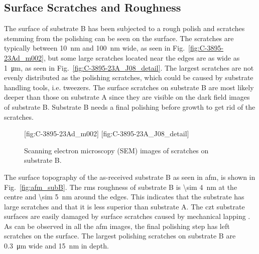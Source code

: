 \subsection{Surface Scratches and Roughness}
The surface of substrate B has been subjected to a rough polish and scratches stemming from the polishing can be seen on the surface. The scratches are typically between \SI{10}{\nano\metre} and \SI{100}{\nano\metre} wide, as seen in Fig.~\ref{fig:C-3895-23Ad_m002}, but some large scratches located near the edges are as wide as \SI{1}{\micro\metre}, as seen in Fig.~\ref{fig:C-3895-23A_J08_detail}. The largest scratches are not evenly distributed as the polishing scratches, which could be caused by substrate handling tools, i.e. tweezers. The surface scratches on substrate B are most likely deeper than those on substrate A since they are visible on the dark field images of substrate B. Substrate B needs a final polishing before growth to get rid of the scratches.
\begin{figure}[htbp]
    \centering
    [fig:C-3895-23Ad_m002]
    [fig:C-3895-23A_J08_detail]
    \caption[SEM images of scratches on substrate B.]{Scanning electron microscopy (SEM) images of scratches on substrate B.}
    \label{fig:SEM_C389523_scratches}
\end{figure}

The surface topography of the as-received substrate B as seen in \ac{afm}, is shown in Fig.~\ref{fig:afm_subB}. The \ac{rms} roughness of substrate B is \SI{\sim 4}{\nano\metre} at the centre and \SI{\sim 5}{\nano\metre} around the edges. This indicates that the substrate has large scratches and that it is less superior than substrate A. The \ac{czt} substrate surfaces are easily damaged by surface scratches caused by mechanical lapping \citep{egan2009scanning}. As can be observed in all the \ac{afm} images, the final polishing step has left scratches on the surface. The largest polishing scratches on substrate B are \SI{0.3}{\micro\metre} wide and \SI{15}{\nano\metre} in depth.

